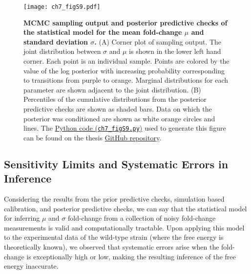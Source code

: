 \documentclass[12pt]{caltech_thesis}
\begin{document}
\hypertarget{fig:empirical_F_post_pred}{%
\begin{figure}
\centering
\texttt{[image: ch7\_figS9.pdf]}
\caption[{MCMC sampling output and posterior predictive checks of the
statistical model for the mean fold-change and standard
deviation.}]{\textbf{MCMC sampling output and posterior predictive
checks of the statistical model for the mean fold-change \(\mu\) and
standard deviation \(\sigma\).} (A) Corner plot of sampling output. The
joint distribution between \(\sigma\) and \(\mu\) is shown in the lower
left hand corner. Each point is an individual sample. Points are colored
by the value of the log posterior with increasing probability
corresponding to transitions from purple to orange. Marginal
distributions for each parameter are shown adjacent to the joint
distribution. (B) Percentiles of the cumulative distributions from the
posterior predictive checks are shown as shaded bars. Data on which the
posterior was conditioned are shown as white orange circles and lines.
The
\href{https://github.com/gchure/phd/blob/master/src/chapter_07/code/ch7_figS9.py}{Python
code (\texttt{ch7\_figS9.py})} used to generate this figure can be found
on the thesis \href{https://github.com/gchure/phd}{GitHub repository}.}
\label{fig:empirical_F_post_pred}
\end{figure}
}

\hypertarget{sensitivity-limits-and-systematic-errors-in-inference}{%
\subsection{Sensitivity Limits and Systematic Errors in
Inference}\label{sensitivity-limits-and-systematic-errors-in-inference}}

Considering the results from the prior predictive checks, simulation
based calibration, and posterior predictive checks, we can say that the
statistical model for inferring \(\mu\) and \(\sigma\) fold-change from
a collection of noisy fold-change measurements is valid and
computationally tractable. Upon applying this model to the experimental
data of the wild-type strain (where the free energy is theoretically
known), we observed that systematic errors arise when the fold-change is
exceptionally high or low, making the resulting inference of the free
energy inaccurate.
\end{document}
